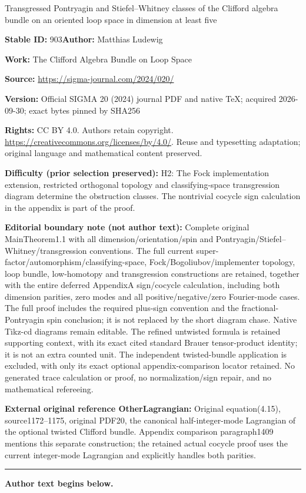 \documentclass[11pt]{article}
\numberwithin{equation}{section}
\numberwithin{equation}{section}
\begin{document}
\begin{center}\Large Transgressed Pontryagin and Stiefel–Whitney classes of the Clifford algebra bundle on an oriented loop space in dimension at least five\end{center}
\noindent\textbf{Stable ID:} 903\quad\textbf{Author:} Matthias Ludewig\par
\noindent\textbf{Work:} The Clifford Algebra Bundle on Loop Space\par
\noindent\textbf{Source:} \url{https://sigma-journal.com/2024/020/}\par
\noindent\textbf{Version:} Official SIGMA 20 (2024) journal PDF and native TeX; acquired 2026-09-30; exact bytes pinned by SHA256\par
\noindent\textbf{Rights:} CC BY 4.0. Authors retain copyright. \url{https://creativecommons.org/licenses/by/4.0/}. Reuse and typesetting adaptation; original language and mathematical content preserved.\par
\noindent\textbf{Difficulty (prior selection preserved):} {\CJKfont H2: The Fock implementation extension, restricted orthogonal topology and classifying-space transgression diagram determine the obstruction classes. The nontrivial cocycle sign calculation in the appendix is part of the proof.}\par
\medskip\noindent\textbf{Editorial boundary note (not author text):} Complete original MainTheorem1.1 with all dimension/orientation/spin and Pontryagin/Stiefel–Whitney/transgression conventions. The full current super-factor/automorphism/classifying-space, Fock/Bogoliubov/implementer topology, loop bundle, low-homotopy and transgression constructions are retained, together with the entire deferred AppendixA sign/cocycle calculation, including both dimension parities, zero modes and all positive/negative/zero Fourier-mode cases. The full proof includes the required plus-sign convention and the fractional-Pontryagin spin conclusion; it is not replaced by the short diagram chase. Native Tikz-cd diagrams remain editable. The refined untwisted formula is retained supporting context, with its exact cited standard Brauer tensor-product identity; it is not an extra counted unit. The independent twisted-bundle application is excluded, with only its exact optional appendix-comparison locator retained. No generated trace calculation or proof, no normalization/sign repair, and no mathematical refereeing.\par
\noindent\textbf{External original reference OtherLagrangian:} Original equation(4.15), source1172–1175, original PDF20, the canonical half-integer-mode Lagrangian of the optional twisted Clifford bundle. Appendix comparison paragraph1409 mentions this separate construction; the retained actual cocycle proof uses the current integer-mode Lagrangian and explicitly handles both parities.\par
\medskip\hrule\medskip\noindent\textbf{Author text begins below.}\par
\end{document}
